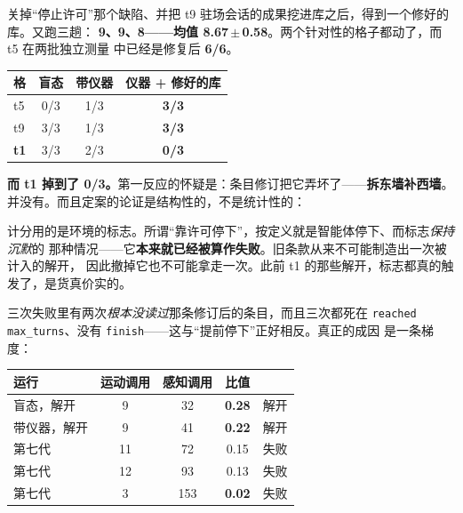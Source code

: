 \documentclass[11pt,a4paper,UTF8,fontset=macnew]{ctexrep}
\begin{document}
关掉“停止许可”那个缺陷、并把 t9 驻场会话的成果挖进库之后，得到一个修好的库。又跑三趟：
\textbf{9、9、8——均值 8.67\,$\pm$\,0.58}。两个针对性的格子都动了，而 t5 在两批独立测量
中已经是修复后 \textbf{6/6}。

\begin{table}[htbp]
\centering\small
\begin{tabular}{@{}l c c c@{}}
\toprule
\textbf{格} & \textbf{盲态} & \textbf{带仪器} & \textbf{仪器 + 修好的库} \\
\midrule
t5 & 0/3 & 1/3 & \textbf{3/3} \\
t9 & 3/3 & 1/3 & \textbf{3/3} \\
\textbf{t1} & 3/3 & 2/3 & \textbf{0/3} \\
\bottomrule
\end{tabular}
\end{table}

\noindent
\textbf{而 t1 掉到了 0/3。}第一反应的怀疑是：条目修订把它弄坏了——\textbf{拆东墙补西墙}。
并没有。而且定案的论证是结构性的，不是统计性的：

\begin{caution}[title={为什么“靠许可拿到的解开”根本不可能被拿走}]
计分用的是环境的标志。所谓“靠许可停下”，按定义就是智能体停下、而标志\emph{保持沉默}的
那种情况——它\textbf{本来就已经被算作失败}。旧条款从来不可能制造出一次被计入的解开，
因此撤掉它也不可能拿走一次。此前 t1 的那些解开，标志都真的触发了，是货真价实的。
\end{caution}

\noindent
三次失败里有两次\emph{根本没读过}那条修订后的条目，而且三次都死在
\texttt{reached max\_turns}、没有 \texttt{finish}——这与“提前停下”正好相反。真正的成因
是一条梯度：

\begin{table}[htbp]
\centering\small
\begin{tabular}{@{}l c c c l@{}}
\toprule
\textbf{运行} & \textbf{运动调用} & \textbf{感知调用} & \textbf{比值} & \\
\midrule
盲态，解开   & 9  & 32  & \textbf{0.28} & 解开 \\
带仪器，解开 & 9  & 41  & \textbf{0.22} & 解开 \\
第七代       & 11 & 72  & 0.15 & 失败 \\
第七代       & 12 & 93  & 0.13 & 失败 \\
第七代       & 3  & 153 & \textbf{0.02} & 失败 \\
\bottomrule
\end{tabular}
\end{table}
\end{document}
